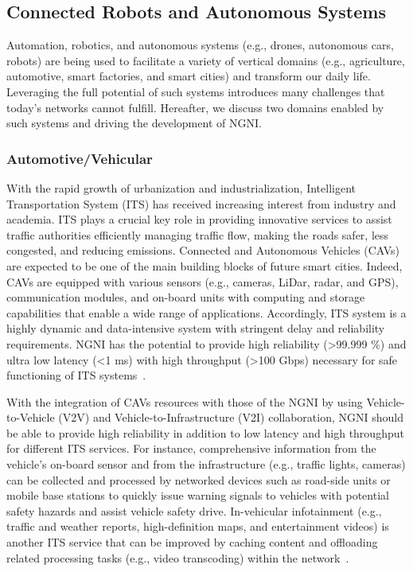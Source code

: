  
 \subsection{Connected Robots and Autonomous Systems}
 
 \noindent Automation, robotics, and autonomous systems (e.g., drones, autonomous cars, robots) are being used to facilitate a variety of vertical domains (e.g., agriculture, automotive, smart factories, and smart cities) and transform our daily life. Leveraging the full potential of such systems introduces many challenges that today’s networks cannot fulfill. Hereafter, we discuss two domains enabled by such systems and driving the development of NGNI.
 
 \subsubsection{Automotive/Vehicular} 
 
\noindent With the rapid growth of urbanization and industrialization, Intelligent Transportation System (ITS) has received increasing interest from industry and academia. ITS plays a crucial key role in providing innovative services to assist traffic authorities efficiently managing traffic flow, making the roads safer, less congested, and reducing emissions. Connected and Autonomous Vehicles (CAVs) are expected to be one of the main building blocks of future smart cities. Indeed, CAVs are equipped with various sensors (e.g., cameras, LiDar, radar, and GPS), communication modules, and on-board units with computing and storage capabilities that enable a wide range of applications. Accordingly, ITS system is a highly dynamic and data-intensive system with stringent delay and reliability requirements. NGNI has the potential to provide high reliability (\textgreater 99.999 \%) and ultra low latency (\textless 1 ms) with high throughput (\textgreater 100 Gbps) necessary for safe functioning of ITS systems~\cite{8869705,9369324}.

With the integration of CAVs resources with those of the NGNI by using Vehicle-to-Vehicle (V2V) and Vehicle-to-Infrastructure (V2I) collaboration, NGNI should be able to provide high reliability in addition to low latency and high throughput for different ITS services. For instance, comprehensive information from the vehicle’s on-board sensor and from the infrastructure (e.g., traffic lights, cameras) can be collected and processed by networked devices such as  road-side units or mobile base stations  to quickly issue warning signals to vehicles with potential safety hazards and assist vehicle safety drive. In-vehicular infotainment (e.g., traffic and weather reports, high-definition maps, and entertainment videos) is another ITS service that can be improved by caching content and offloading related processing tasks (e.g., video transcoding) within the network~\cite{DZIYAUDDIN2021108228}.

